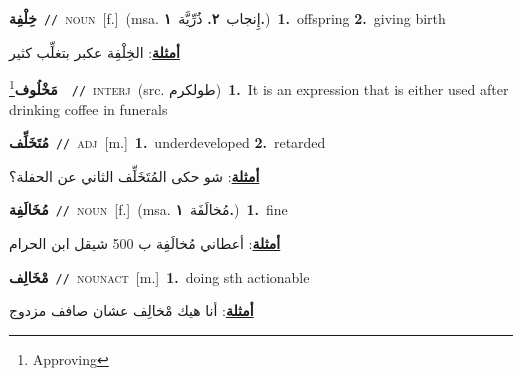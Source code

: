 \documentclass[10pt,a4paper,twoside]{article} %
\begin{document}
\begin{multicols}{2}
{\setlength\topsep{0pt}\textbf{\foreignlanguage{arabic}{خِلْفِة}}\ {\color{gray}\texttt{//}\color{black}}\ \textsc{noun}\ [f.]\ \color{gray}(msa. \foreignlanguage{arabic}{إِنجاب}~\foreignlanguage{arabic}{\textbf{٢.}}  \foreignlanguage{arabic}{ذُرِّيَّة}~\foreignlanguage{arabic}{\textbf{١.}})\color{black}\ \textbf{1.}~offspring  \textbf{2.}~giving birth\  \begin{flushright}\color{gray}\foreignlanguage{arabic}{\textbf{\underline{\foreignlanguage{arabic}{أمثلة}}}: الخِلْفِة عكبر بتغلِّب كثير}\end{flushright}\color{black}} \vspace{2mm}

{\setlength\topsep{0pt}\textbf{\foreignlanguage{arabic}{مَخْلُوف}}\footnote{Approving}\ \ {\color{gray}\texttt{//}\color{black}}\ \textsc{interj}\ (src. \color{gray}\foreignlanguage{arabic}{طولكرم}\color{black})\ \textbf{1.}~It is an expression that is either used after drinking coffee in funerals\ } \vspace{2mm}

{\setlength\topsep{0pt}\textbf{\foreignlanguage{arabic}{مُتَخَلِّف}}\ {\color{gray}\texttt{//}\color{black}}\ \textsc{adj}\ [m.]\ \textbf{1.}~underdeveloped  \textbf{2.}~retarded\  \begin{flushright}\color{gray}\foreignlanguage{arabic}{\textbf{\underline{\foreignlanguage{arabic}{أمثلة}}}: شو حكى المُتَخَلِّف الثاني عن الحفلة؟}\end{flushright}\color{black}} \vspace{2mm}

{\setlength\topsep{0pt}\textbf{\foreignlanguage{arabic}{مُخَالَفِة}}\ {\color{gray}\texttt{//}\color{black}}\ \textsc{noun}\ [f.]\ \color{gray}(msa. \foreignlanguage{arabic}{مُخالَفَة}~\foreignlanguage{arabic}{\textbf{١.}})\color{black}\ \textbf{1.}~fine\  \begin{flushright}\color{gray}\foreignlanguage{arabic}{\textbf{\underline{\foreignlanguage{arabic}{أمثلة}}}: أعطاني مُخالَفِة ب 500 شيقل ابن الحرام}\end{flushright}\color{black}} \vspace{2mm}

{\setlength\topsep{0pt}\textbf{\foreignlanguage{arabic}{مْخَالِف}}\ {\color{gray}\texttt{//}\color{black}}\ \textsc{noun\textunderscore act}\ [m.]\ \textbf{1.}~doing sth actionable\  \begin{flushright}\color{gray}\foreignlanguage{arabic}{\textbf{\underline{\foreignlanguage{arabic}{أمثلة}}}: أنا هيك مْخالِف عشان صافف مزدوج}\end{flushright}\color{black}} \vspace{2mm}


\end{multicols}
\end{document}
